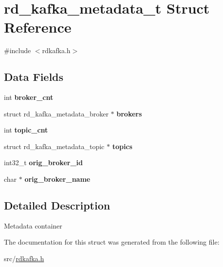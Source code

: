\hypertarget{structrd__kafka__metadata__t}{\section{rd\-\_\-kafka\-\_\-metadata\-\_\-t Struct Reference}
\label{structrd__kafka__metadata__t}
}


{\ttfamily \#include $<$rdkafka.\-h$>$}

\subsection*{Data Fields}
\begin{DoxyCompactItemize}
\item 
\hypertarget{structrd__kafka__metadata__t_a856ef1431ec96dc5e17aa201eabb471d}{int {\bfseries broker\-\_\-cnt}}\label{structrd__kafka__metadata__t_a856ef1431ec96dc5e17aa201eabb471d}

\item 
\hypertarget{structrd__kafka__metadata__t_ad42c894b30cf7bd1d2a737b3ebc41e72}{struct rd\-\_\-kafka\-\_\-metadata\-\_\-broker $\ast$ {\bfseries brokers}}\label{structrd__kafka__metadata__t_ad42c894b30cf7bd1d2a737b3ebc41e72}

\item 
\hypertarget{structrd__kafka__metadata__t_acaafc5b2980d35330c213dfa7b3ae063}{int {\bfseries topic\-\_\-cnt}}\label{structrd__kafka__metadata__t_acaafc5b2980d35330c213dfa7b3ae063}

\item 
\hypertarget{structrd__kafka__metadata__t_aaf7472220f7c197fb7cd4a73a40ba1b8}{struct rd\-\_\-kafka\-\_\-metadata\-\_\-topic $\ast$ {\bfseries topics}}\label{structrd__kafka__metadata__t_aaf7472220f7c197fb7cd4a73a40ba1b8}

\item 
\hypertarget{structrd__kafka__metadata__t_a5ad3f68559288a9d95698bb830d7b5ed}{int32\-\_\-t {\bfseries orig\-\_\-broker\-\_\-id}}\label{structrd__kafka__metadata__t_a5ad3f68559288a9d95698bb830d7b5ed}

\item 
\hypertarget{structrd__kafka__metadata__t_a6d94b09d2634a23e3ffa3c0bb5b9f5e4}{char $\ast$ {\bfseries orig\-\_\-broker\-\_\-name}}\label{structrd__kafka__metadata__t_a6d94b09d2634a23e3ffa3c0bb5b9f5e4}

\end{DoxyCompactItemize}


\subsection{Detailed Description}
Metadata container 

The documentation for this struct was generated from the following file\-:\begin{DoxyCompactItemize}
\item 
src/\hyperlink{rdkafka_8h}{rdkafka.\-h}\end{DoxyCompactItemize}
